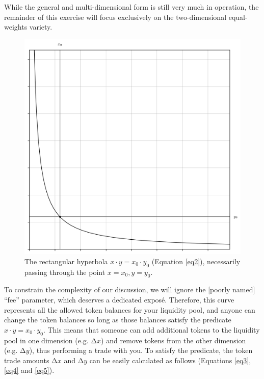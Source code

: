 \documentclass{article}
\begin{document}
While the general and multi-dimensional form is still very much in operation, the remainder of this exercise will focus exclusively on the two-dimensional equal-weights variety. 

\begin{figure}[ht]
    \centering
    \includegraphics[width=\textwidth]{fig03.png}
    \captionsetup{
        justification=raggedright,
        singlelinecheck=false,
        font=small,
        labelfont=bf,
        labelsep=quad,
        format=plain
    }
    \caption{The rectangular hyperbola $ x \cdot y = x_{0} \cdot y_{0}$ (Equation \ref{eq2}), necessarily passing through the point $x = x_{0}, y = y_{0}$.}
    \label{fig3}
\end{figure}

To constrain the complexity of our discussion, we will ignore the [poorly named] “fee” parameter, which deserves a dedicated exposé. Therefore, this curve represents all the allowed token balances for your liquidity pool, and anyone can change the token balances so long as those balances satisfy the predicate $x \cdot y = x_{0} \cdot y_{0}$. This means that someone can add additional tokens to the liquidity pool in one dimension (e.g. $\mathrm{\Delta}x$) and remove tokens from the other dimension (e.g. $\mathrm{\Delta}y$), thus performing a trade with you. To satisfy the predicate, the token trade amounts $\mathrm{\Delta}x$ and $\mathrm{\Delta}y$ can be easily calculated as follows (Equations \ref{eq3}, \ref{eq4} and \ref{eq5}).
\end{document}
